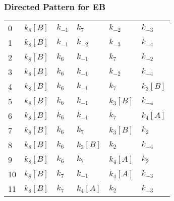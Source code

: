 \documentclass{article}%
\begin{document}
\subsubsection{Directed Pattern for EB}%
\label{ssubsec:Directed Pattern for EB}%
\begin{tabular}{llllll}
\toprule
0  &  $k_{8}$$[B]$ &  $k_{-1}$ &       $k_{7}$ &      $k_{-2}$ &      $k_{-3}$ \\
1  &  $k_{8}$$[B]$ &  $k_{-1}$ &      $k_{-2}$ &      $k_{-3}$ &      $k_{-4}$ \\
2  &  $k_{8}$$[B]$ &   $k_{6}$ &      $k_{-1}$ &       $k_{7}$ &      $k_{-2}$ \\
3  &  $k_{8}$$[B]$ &   $k_{6}$ &      $k_{-1}$ &      $k_{-2}$ &      $k_{-4}$ \\
4  &  $k_{8}$$[B]$ &   $k_{6}$ &      $k_{-1}$ &       $k_{7}$ &  $k_{3}$$[B]$ \\
5  &  $k_{8}$$[B]$ &   $k_{6}$ &      $k_{-1}$ &  $k_{3}$$[B]$ &      $k_{-4}$ \\
6  &  $k_{8}$$[B]$ &   $k_{6}$ &      $k_{-1}$ &       $k_{7}$ &  $k_{4}$$[A]$ \\
7  &  $k_{8}$$[B]$ &   $k_{6}$ &       $k_{7}$ &  $k_{3}$$[B]$ &       $k_{2}$ \\
8  &  $k_{8}$$[B]$ &   $k_{6}$ &  $k_{3}$$[B]$ &       $k_{2}$ &      $k_{-4}$ \\
9  &  $k_{8}$$[B]$ &   $k_{6}$ &       $k_{7}$ &  $k_{4}$$[A]$ &       $k_{2}$ \\
10 &  $k_{8}$$[B]$ &   $k_{7}$ &      $k_{-1}$ &  $k_{4}$$[A]$ &      $k_{-3}$ \\
11 &  $k_{8}$$[B]$ &   $k_{7}$ &  $k_{4}$$[A]$ &       $k_{2}$ &      $k_{-3}$ \\
\bottomrule
\end{tabular}

%
\end{document}
